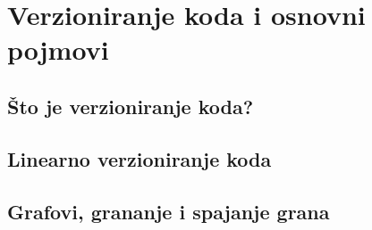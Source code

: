 \chapter*{Verzioniranje koda i osnovni pojmovi}

\section*{Što je verzioniranje koda?}



\section*{Linearno verzioniranje koda}





\section*{Grafovi, grananje i spajanje grana}

















